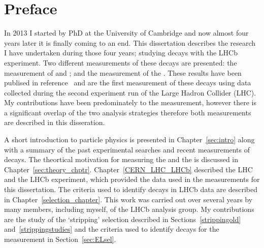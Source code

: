 \chapter{Preface}

In 2013 I started by PhD at the University of Cambridge and now almost four years later it is finally coming to an end. This dissertation describes the research I have undertaken during those four years; studying \bmumu decays with the LHCb experiment. Two different measurements of these decays are presented: the measurement of \bdmumu and \bsmumu \BFs; and the measurement of the \bsmumu \el. These results have been publised in reference~\cite{Aaij:2017vad} and are the first measurement of these decays using data collected during the second experiment run of the Large Hadron Collider (LHC). My contributions have been predominately to the \el measurement, however there is a significant overlap of the two analysis strategies therefore both measurements are described in this disseration.

A short introduction to particle physics is presented in Chapter~\ref{sec:intro} along with a summary of the past experimental searches and recent measurements of \bmumu decays. The theortical motivation for measuring the \bmumu \BFs and the \bsmumu \el is discussed in Chapter~\ref{sec:theory_chptr}.
Chapter~\ref{CERN_LHC_LHCb} described the LHC and the LHCb experiment, which provided the data used in the measurements for this dissertation.
The criteria used to identify \bmumu decays in LHCb data are described in Chapter~\ref{selection_chapter}. This work was carried out over several years by many members, including myself, of the \bmumu LHCb analysis group. My contributions are the study of the `stripping' selection described in Sections~\ref{strippingold} and~\ref{strippingstudies} and the criteria used to identify \bsmumu decays for the \el measurement in Section~\ref{sec:ELsel}.

